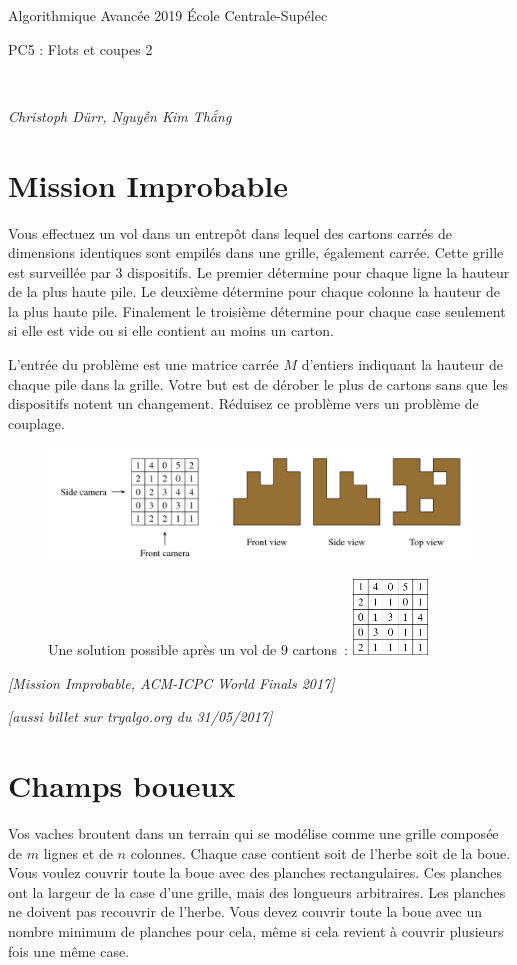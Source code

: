 \documentclass[12pt]{article}
\newcommand{\source}[1]{\begin{flushright}\emph{[#1]}\end{flushright}}
\newcommand{\MakeScribeTop}[1]{
\noindent
\begin{framed}
\noindent
 Algorithmique Avancée 2019
 \hfill
 École Centrale-Supélec
 \\[1em]
 \centerline{ \Large
#1
 }
 \\[1em]
\centerline{  \it Christoph Dürr, Nguyễn Kim Thắng}
\end{framed}
}
\begin{document}
    \MakeScribeTop{PC5 : Flots et coupes 2}

\section{Mission Improbable}

Vous effectuez un vol dans un entrepôt dans lequel des cartons carrés de dimensions identiques sont empilés dans une grille, également carrée.  
Cette grille est surveillée par 3 dispositifs. Le premier détermine pour chaque ligne la hauteur de la plus haute pile.
Le deuxième détermine pour chaque colonne la hauteur de la plus haute pile.
Finalement le troisième détermine pour chaque case seulement si elle est vide ou si elle contient au moins un carton.

L'entrée du problème est une matrice carrée $M$ d'entiers indiquant la hauteur de chaque pile dans la grille.
Votre but est de dérober le plus de cartons sans que les dispositifs notent un changement.  Réduisez ce problème vers un problème de couplage.

\begin{figure}[h]
	\centerline{\includegraphics{mission_impossible_in.png}}
	\centerline{Une solution possible après un vol de 9 cartons~: \includegraphics[width=2cm]{mission_impossible_out.png}}
\end{figure}

\source{Mission Improbable, ACM-ICPC World Finals 2017}
\source{aussi billet sur tryalgo.org du 31/05/2017}

\newpage 
\section{Champs boueux}

Vos vaches broutent dans un terrain qui se modélise comme une grille composée de $m$ lignes et de $n$ colonnes. Chaque case contient soit de l'herbe soit de la boue. Vous voulez couvrir toute la boue avec des planches rectangulaires. Ces planches ont la largeur de la case d'une grille, mais des longueurs arbitraires. Les planches ne doivent pas recouvrir de l'herbe.  Vous devez couvrir toute la boue avec un nombre minimum de planches pour cela, même si cela revient à couvrir plusieurs fois une même case. 
\end{document}
